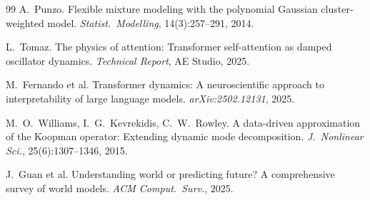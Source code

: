 \documentclass[11pt]{article}
\theoremstyle{definition}
\begin{document}
\begin{thebibliography}{99}
 A.~Punzo. Flexible mixture modeling with the polynomial Gaussian cluster-weighted model. \textit{Statist.\ Modelling}, 14(3):257--291, 2014.

 L.~Tomaz. The physics of attention: Transformer self-attention as damped oscillator dynamics. \textit{Technical Report}, AE Studio, 2025.

 M.~Fernando et al. Transformer dynamics: A neuroscientific approach to interpretability of large language models. \textit{arXiv:2502.12131}, 2025.

 M.~O.~Williams, I.~G.~Kevrekidis, C.~W.~Rowley. A data-driven approximation of the Koopman operator: Extending dynamic mode decomposition. \textit{J.~Nonlinear Sci.}, 25(6):1307--1346, 2015.

 J.~Guan et al. Understanding world or predicting future? A comprehensive survey of world models. \textit{ACM Comput.\ Surv.}, 2025.

\end{thebibliography}
\end{document}
